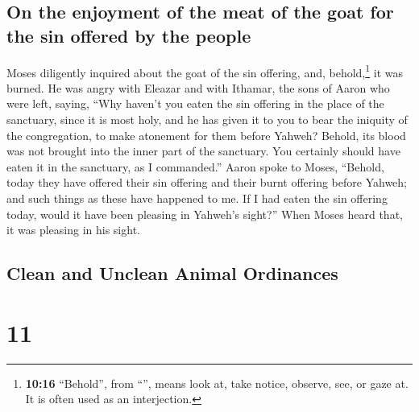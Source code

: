 \hypertarget{on-the-enjoyment-of-the-meat-of-the-goat-for-the-sin-offered-by-the-people}{%
\subsection{On the enjoyment of the meat of the goat for the sin offered
by the
people}\label{on-the-enjoyment-of-the-meat-of-the-goat-for-the-sin-offered-by-the-people}}

 Moses diligently inquired about the goat of the sin
offering, and, behold,\footnote{\textbf{10:16} ``Behold'', from
  ``'', means look at, take notice, observe, see, or gaze
  at. It is often used as an interjection.} it was burned. He was angry
with Eleazar and with Ithamar, the sons of Aaron who were left, saying,
 ``Why haven't you eaten the sin offering in the place of
the sanctuary, since it is most holy, and he has given it to you to bear
the iniquity of the congregation, to make atonement for them before
Yahweh?  Behold, its blood was not brought into the inner
part of the sanctuary. You certainly should have eaten it in the
sanctuary, as I commanded.''  Aaron spoke to Moses,
``Behold, today they have offered their sin offering and their burnt
offering before Yahweh; and such things as these have happened to me. If
I had eaten the sin offering today, would it have been pleasing in
Yahweh's sight?''  When Moses heard that, it was pleasing
in his sight.

\hypertarget{clean-and-unclean-animal-ordinances}{%
\subsection{Clean and Unclean Animal
Ordinances}\label{clean-and-unclean-animal-ordinances}}

\hypertarget{section-10}{%
\section{11}\label{section-10}}

